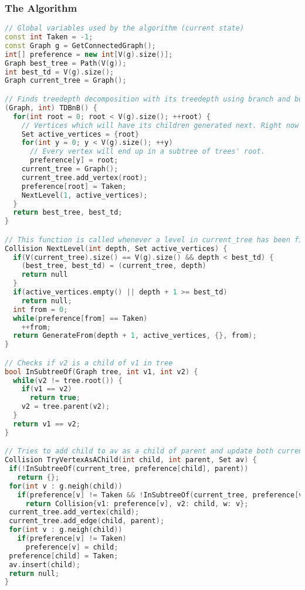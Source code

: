 \subsubsection{The Algorithm}
\begin{lstlisting}[language=C++]
// Global variables used by the algorithm (current state)
const int Taken = -1;
const Graph g = GetConnectedGraph();
int[] preference = new int[V(g).size()];
Graph best_tree = Path(V(g));
int best_td = V(g).size();
Graph current_tree = Graph();

// Finds treedepth decomposition with its treedepth using branch and bound technique
(Graph, int) TDBnB() {
  for(int root = 0; root < V(g).size(); ++root) {
    // Vertices which will have its children generated next. Right now it's just root.
    Set active_vertices = {root}
    for(int y = 0; y < V(g).size(); ++y)
      // Every vertex will end up in a subtree of trees' root.
      preference[y] = root;
    current_tree = Graph();
    current_tree.add_vertex(root);
    preference[root] = Taken;
    NextLevel(1, active_vertices);
  }
  return best_tree, best_td;
}

// This function is called whenever a level in current_tree has been finished. active_vertices is a set of vertices which will have its children chosen next. Depth tells us how deep finished level is. It checks whether we have a chance improving previous results and starts generation of next level.
Collision NextLevel(int depth, Set active_vertices) {
  if(V(current_tree).size() == V(g).size() && depth < best_td) {
    (best_tree, best_td) = (current_tree, depth)
    return null
  }
  if(active_vertices.empty() || depth + 1 >= best_td)
    return null;
  int from = 0;
  while(preference[from] == Taken)
    ++from;
  return GenerateFrom(depth + 1, active_vertices, {}, from);
}

// Checks if v2 is a child of v1 in tree
bool InSubtreeOf(Graph tree, int v1, int v2) {
  while(v2 != tree.root()) {
    if(v1 == v2)
      return true;
    v2 = tree.parent(v2);
  }
  return v1 == v2;
}

// Tries to add child to av as a child of parent and update both current_tree and preferences. When it contradics with treedepth decomposition definition, it returns an error and makes no changes to current state.
Collision TryVertexAsAChild(int child, int parent, Set av) {
 if(!InSubtreeOf(current_tree, preference[child], parent))
   return {};
 for(int v : g.neigh(child))
   if(preference[v] != Taken && !InSubtreeOf(current_tree, preference[v], parent))
     return Collision{v1: preference[v], v2: child, w: v};
 current_tree.add_vertex(child);
 current_tree.add_edge(child, parent);
 for(int v : g.neigh(child))
   if(preference[v] != Taken)
     preference[v] = child;
 preference[child] = Taken;
 av.insert(child);
 return null;
}


\end{lstlisting}
